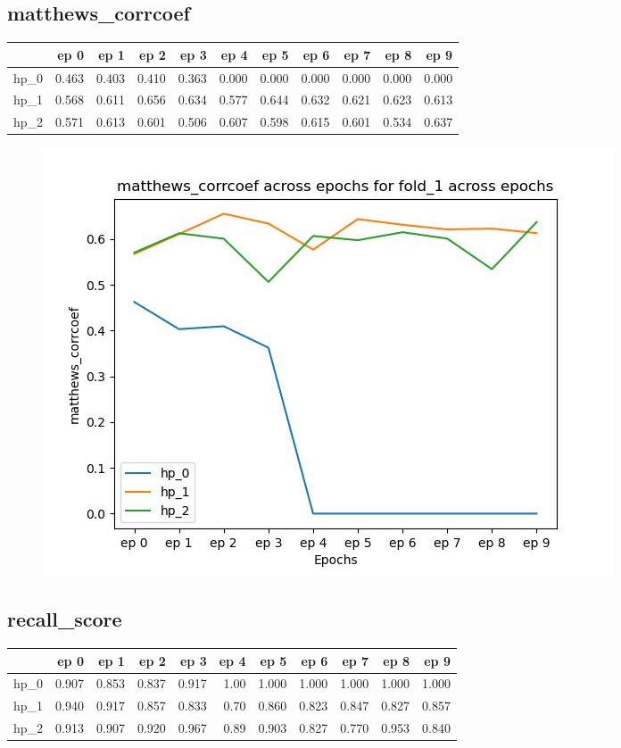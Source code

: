 \documentclass{article}
\begin{document}
\subsection{matthews\_corrcoef}
\begin{tabular}{lrrrrrrrrrr}
\toprule
{} &   ep 0 &   ep 1 &   ep 2 &   ep 3 &   ep 4 &   ep 5 &   ep 6 &   ep 7 &   ep 8 &   ep 9 \\
\midrule
hp\_0 &  0.463 &  0.403 &  0.410 &  0.363 &  0.000 &  0.000 &  0.000 &  0.000 &  0.000 &  0.000 \\
hp\_1 &  0.568 &  0.611 &  0.656 &  0.634 &  0.577 &  0.644 &  0.632 &  0.621 &  0.623 &  0.613 \\
hp\_2 &  0.571 &  0.613 &  0.601 &  0.506 &  0.607 &  0.598 &  0.615 &  0.601 &  0.534 &  0.637 \\
\bottomrule
\end{tabular}

\begin{figure}[H]
\includegraphics[scale = 0.75]{fold_1/matthews_corrcoef}
\end{figure}
\subsection{recall\_score}
\begin{tabular}{lrrrrrrrrrr}
\toprule
{} &   ep 0 &   ep 1 &   ep 2 &   ep 3 &  ep 4 &   ep 5 &   ep 6 &   ep 7 &   ep 8 &   ep 9 \\
\midrule
hp\_0 &  0.907 &  0.853 &  0.837 &  0.917 &  1.00 &  1.000 &  1.000 &  1.000 &  1.000 &  1.000 \\
hp\_1 &  0.940 &  0.917 &  0.857 &  0.833 &  0.70 &  0.860 &  0.823 &  0.847 &  0.827 &  0.857 \\
hp\_2 &  0.913 &  0.907 &  0.920 &  0.967 &  0.89 &  0.903 &  0.827 &  0.770 &  0.953 &  0.840 \\
\bottomrule
\end{tabular}
\end{document}
